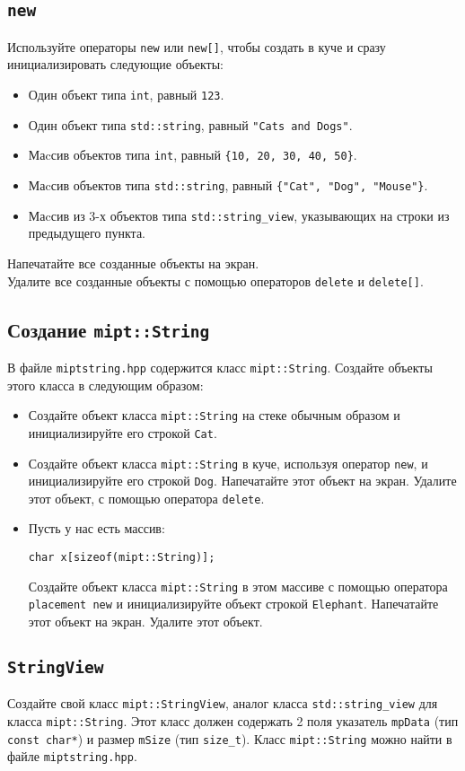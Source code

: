 \documentclass{article}
\begin{document}
\subsection{\texttt{new}}
Используйте операторы \texttt{new} или \texttt{new[]}, чтобы создать в куче и сразу инициализировать следующие объекты:
\begin{itemize}
\item Один объект типа \texttt{int}, равный \texttt{123}.
\item Один объект типа \texttt{std::string}, равный \texttt{"Cats and Dogs"}.
\item Маcсив объектов типа \texttt{int}, равный \texttt{\{10, 20, 30, 40, 50\}}.
\item Маcсив объектов типа \texttt{std::string}, равный \texttt{\{"Cat"{}, "Dog"{}, "Mouse"\}}.
\item Маcсив из 3-х объектов типа \texttt{std::string\_view}, указывающих на строки из предыдущего пункта.
\end{itemize}
Напечатайте все созданные объекты на экран.\\
Удалите все созданные объекты с помощью операторов \texttt{delete} и \texttt{delete[]}.

\subsection{Создание \texttt{mipt::String}}
В файле \texttt{miptstring.hpp} содержится класс \texttt{mipt::String}. Создайте объекты этого класса в следующим образом:
\begin{itemize}
\item Создайте объект класса \texttt{mipt::String} на стеке обычным образом и инициализируйте его строкой \texttt{Cat}.
\item Создайте объект класса \texttt{mipt::String} в куче, используя оператор \texttt{new}, и инициализируйте его строкой \texttt{Dog}. Напечатайте этот объект на экран. Удалите этот объект, с помощью оператора \texttt{delete}.
\item Пусть у нас есть массив:
\begin{lstlisting}
char x[sizeof(mipt::String)];
\end{lstlisting}
Создайте объект класса \texttt{mipt::String} в этом массиве с помощью оператора \texttt{placement new} и инициализируйте объект строкой \texttt{Elephant}. Напечатайте этот объект на экран. Удалите этот объект.
\end{itemize}


\subsection{\texttt{StringView}}
Создайте свой класс \texttt{mipt::StringView}, аналог класса \texttt{std::string\_view} для класса \texttt{mipt::String}.
Этот класс должен содержать 2 поля указатель \texttt{mpData} (тип \texttt{const char*}) и размер \texttt{mSize} (тип \texttt{size\_t}). Класс \texttt{mipt::String} можно найти в файле \texttt{miptstring.hpp}.\\
\end{document}
